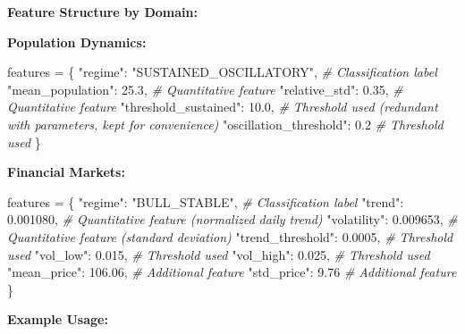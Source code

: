 \documentclass[
]{article}
\newenvironment{Shaded}{}{}
\newcommand{\CommentTok}[1]{\textcolor[rgb]{0.38,0.63,0.69}{\textit{#1}}}
\newcommand{\FloatTok}[1]{\textcolor[rgb]{0.25,0.63,0.44}{#1}}
\newcommand{\NormalTok}[1]{#1}
\newcommand{\OperatorTok}[1]{\textcolor[rgb]{0.40,0.40,0.40}{#1}}
\newcommand{\StringTok}[1]{\textcolor[rgb]{0.25,0.44,0.63}{#1}}
\begin{document}
\textbf{Feature Structure by Domain:}

\textbf{Population Dynamics:}

\begin{Shaded}
\begin{Highlighting}[]
\NormalTok{features }\OperatorTok{=}\NormalTok{ \{}
    \StringTok{"regime"}\NormalTok{: }\StringTok{"SUSTAINED\_OSCILLATORY"}\NormalTok{,     }\CommentTok{\# Classification label}
    \StringTok{"mean\_population"}\NormalTok{: }\FloatTok{25.3}\NormalTok{,               }\CommentTok{\# Quantitative feature}
    \StringTok{"relative\_std"}\NormalTok{: }\FloatTok{0.35}\NormalTok{,                  }\CommentTok{\# Quantitative feature}
    \StringTok{"threshold\_sustained"}\NormalTok{: }\FloatTok{10.0}\NormalTok{,           }\CommentTok{\# Threshold used (redundant with parameters, kept for convenience)}
    \StringTok{"oscillation\_threshold"}\NormalTok{: }\FloatTok{0.2}           \CommentTok{\# Threshold used}
\NormalTok{\}}
\end{Highlighting}
\end{Shaded}

\textbf{Financial Markets:}

\begin{Shaded}
\begin{Highlighting}[]
\NormalTok{features }\OperatorTok{=}\NormalTok{ \{}
    \StringTok{"regime"}\NormalTok{: }\StringTok{"BULL\_STABLE"}\NormalTok{,               }\CommentTok{\# Classification label}
    \StringTok{"trend"}\NormalTok{: }\FloatTok{0.001080}\NormalTok{,                     }\CommentTok{\# Quantitative feature (normalized daily trend)}
    \StringTok{"volatility"}\NormalTok{: }\FloatTok{0.009653}\NormalTok{,                }\CommentTok{\# Quantitative feature (standard deviation)}
    \StringTok{"trend\_threshold"}\NormalTok{: }\FloatTok{0.0005}\NormalTok{,             }\CommentTok{\# Threshold used}
    \StringTok{"vol\_low"}\NormalTok{: }\FloatTok{0.015}\NormalTok{,                      }\CommentTok{\# Threshold used}
    \StringTok{"vol\_high"}\NormalTok{: }\FloatTok{0.025}\NormalTok{,                     }\CommentTok{\# Threshold used}
    \StringTok{"mean\_price"}\NormalTok{: }\FloatTok{106.06}\NormalTok{,                  }\CommentTok{\# Additional feature}
    \StringTok{"std\_price"}\NormalTok{: }\FloatTok{9.76}                      \CommentTok{\# Additional feature}
\NormalTok{\}}
\end{Highlighting}
\end{Shaded}

\textbf{Example Usage:}
\end{document}
